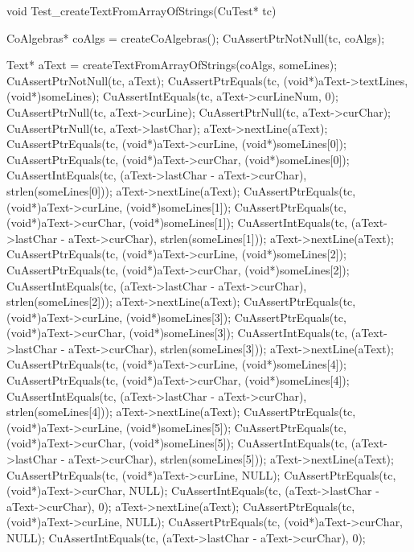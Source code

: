 void Test_createTextFromArrayOfStrings(CuTest* tc) {
  CoAlgebras* coAlgs = createCoAlgebras();
  CuAssertPtrNotNull(tc, coAlgs);

  Text* aText = createTextFromArrayOfStrings(coAlgs, someLines);
  CuAssertPtrNotNull(tc, aText);
  CuAssertPtrEquals(tc, (void*)aText->textLines, (void*)someLines);
  CuAssertIntEquals(tc, aText->curLineNum, 0);
  CuAssertPtrNull(tc, aText->curLine);
  CuAssertPtrNull(tc, aText->curChar);
  CuAssertPtrNull(tc, aText->lastChar);
  aText->nextLine(aText);
  CuAssertPtrEquals(tc, (void*)aText->curLine, (void*)someLines[0]);
  CuAssertPtrEquals(tc, (void*)aText->curChar, (void*)someLines[0]);
  CuAssertIntEquals(tc, (aText->lastChar - aText->curChar),
                        strlen(someLines[0]));
  aText->nextLine(aText);
  CuAssertPtrEquals(tc, (void*)aText->curLine, (void*)someLines[1]);
  CuAssertPtrEquals(tc, (void*)aText->curChar, (void*)someLines[1]);
  CuAssertIntEquals(tc, (aText->lastChar - aText->curChar),
                        strlen(someLines[1]));
  aText->nextLine(aText);
  CuAssertPtrEquals(tc, (void*)aText->curLine, (void*)someLines[2]);
  CuAssertPtrEquals(tc, (void*)aText->curChar, (void*)someLines[2]);
  CuAssertIntEquals(tc, (aText->lastChar - aText->curChar),
                        strlen(someLines[2]));
  aText->nextLine(aText);
  CuAssertPtrEquals(tc, (void*)aText->curLine, (void*)someLines[3]);
  CuAssertPtrEquals(tc, (void*)aText->curChar, (void*)someLines[3]);
  CuAssertIntEquals(tc, (aText->lastChar - aText->curChar),
                        strlen(someLines[3]));
  aText->nextLine(aText);
  CuAssertPtrEquals(tc, (void*)aText->curLine, (void*)someLines[4]);
  CuAssertPtrEquals(tc, (void*)aText->curChar, (void*)someLines[4]);
  CuAssertIntEquals(tc, (aText->lastChar - aText->curChar),
                        strlen(someLines[4]));
  aText->nextLine(aText);
  CuAssertPtrEquals(tc, (void*)aText->curLine, (void*)someLines[5]);
  CuAssertPtrEquals(tc, (void*)aText->curChar, (void*)someLines[5]);
  CuAssertIntEquals(tc, (aText->lastChar - aText->curChar),
                        strlen(someLines[5]));
  aText->nextLine(aText);
  CuAssertPtrEquals(tc, (void*)aText->curLine, NULL);
  CuAssertPtrEquals(tc, (void*)aText->curChar, NULL);
  CuAssertIntEquals(tc, (aText->lastChar - aText->curChar), 0);
  aText->nextLine(aText);
  CuAssertPtrEquals(tc, (void*)aText->curLine, NULL);
  CuAssertPtrEquals(tc, (void*)aText->curChar, NULL);
  CuAssertIntEquals(tc, (aText->lastChar - aText->curChar), 0);
}

